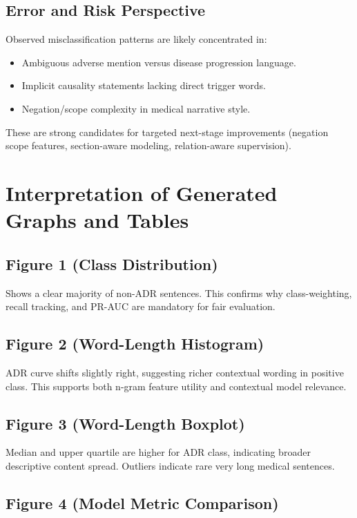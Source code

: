 \documentclass[11pt]{article}
\begin{document}
\subsection{Error and Risk Perspective}

Observed misclassification patterns are likely concentrated in:


\begin{itemize}
  \item Ambiguous adverse mention versus disease progression language.
  \item Implicit causality statements lacking direct trigger words.
  \item Negation/scope complexity in medical narrative style.
\end{itemize}

These are strong candidates for targeted next-stage improvements (negation scope features, section-aware modeling, relation-aware supervision).


\section{Interpretation of Generated Graphs and Tables}

\subsection{Figure 1 (Class Distribution)}

Shows a clear majority of non-ADR sentences. This confirms why class-weighting, recall tracking, and PR-AUC are mandatory for fair evaluation.


\subsection{Figure 2 (Word-Length Histogram)}

ADR curve shifts slightly right, suggesting richer contextual wording in positive class. This supports both n-gram feature utility and contextual model relevance.


\subsection{Figure 3 (Word-Length Boxplot)}

Median and upper quartile are higher for ADR class, indicating broader descriptive content spread. Outliers indicate rare very long medical sentences.


\subsection{Figure 4 (Model Metric Comparison)}
\end{document}
